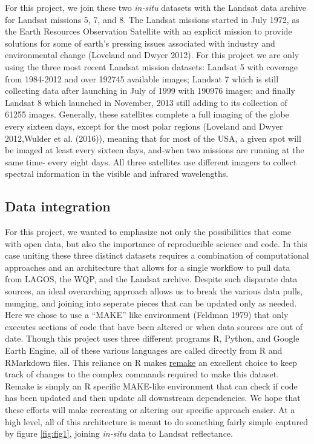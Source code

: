 \documentclass[]{article}
\begin{document}
For this project, we join these two \emph{in-situ} datasets with the
Landsat data archive for Landsat missions 5, 7, and 8. The Landsat
missions started in July 1972, as the Earth Resources Observation
Satellite with an explicit mission to provide solutions for some of
earth's pressing issues associated with industry and environmental
change (Loveland and Dwyer 2012). For this project we are only using the
three most recent Landsat mission datasets: Landsat 5 with coverage from
1984-2012 and over 192745 available images; Landsat 7 which is still
collecting data after launching in July of 1999 with 190976 images; and
finally Landsat 8 which launched in November, 2013 still adding to its
collection of 61255 images. Generally, these satellites complete a full
imaging of the globe every sixteen days, except for the most polar
regions (Loveland and Dwyer 2012,Wulder et al. (2016)), meaning that for
most of the USA, a given spot will be imaged at least every sixteen
days, and-when two missions are running at the same time- every eight
days. All three satellites use different imagers to collect spectral
information in the visible and infrared wavelengths.

\subsection{Data integration}\label{data-integration}

For this project, we wanted to emphasize not only the possibilities that
come with open data, but also the importance of reproducible science and
code. In this case uniting these three distinct datasets requires a
combination of computational approaches and an architecture that allows
for a single workflow to pull data from LAGOS, the WQP, and the Landsat
archive. Despite such disparate data sources, an ideal overarching
approach allows us to break the various data pulls, munging, and joining
into seperate pieces that can be updated only as needed. Here we chose
to use a ``MAKE'' like environment (Feldman 1979) that only executes
sections of code that have been altered or when data sources are out of
date. Though this project uses three different programs R, Python, and
Google Earth Engine, all of these various languages are called directly
from R and RMarkdown files. This reliance on R makes
\href{https://github.com/richfitz/remake}{remake} an excellent choice to
keep track of changes to the complex commands required to make this
dataset. Remake is simply an R specific MAKE-like environment that can
check if code has been updated and then update all downstream
dependencies. We hope that these efforts will make recreating or
altering our specific approach easier. At a high level, all of this
architecture is meant to do something fairly simple captured by figure
\ref{fig:fig1}, joining \emph{in-situ} data to Landsat reflectance.
\end{document}
